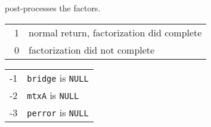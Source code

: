 \begin{enumerate}
post-processes the factors.
\par {}
\begin{center}
\begin{tabular}{ll}
~1 & normal return, factorization did complete \\
~0 & factorization did not complete \\
\end{tabular}
\begin{tabular}{ll}
-1 & \texttt{bridge} is \texttt{NULL} \\
-2 & \texttt{mtxA} is \texttt{NULL} \\
-3 & \texttt{perror} is \texttt{NULL} \\
\end{tabular}
\end{center}
\end{enumerate}
\par
